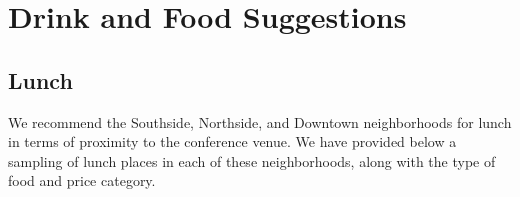 \chapter{Drink and Food Suggestions}

\setlength\fboxsep{0pt}
\setlength\fboxrule{0.5pt}

\vspace{-1.5cm}
 \section{Lunch}

\begin{figure}[h!]
\center
{}
\end{figure}

We recommend the Southside, Northside, and Downtown neighborhoods for lunch in terms of proximity to the conference venue. We have provided below a sampling of lunch places in each of these neighborhoods, along with the type of food and price category. 

